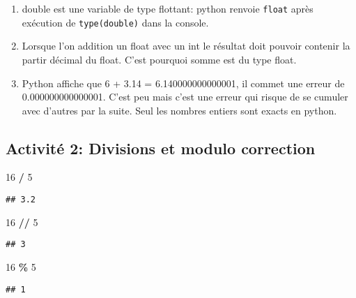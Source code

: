 \documentclass[
]{book}
\newenvironment{Shaded}{\begin{snugshade}}{\end{snugshade}}
\newcommand{\DecValTok}[1]{\textcolor[rgb]{0.00,0.00,0.81}{#1}}
\newcommand{\OperatorTok}[1]{\textcolor[rgb]{0.81,0.36,0.00}{\textbf{#1}}}
\providecommand{\tightlist}{%
  \setlength{\itemsep}{0pt}\setlength{\parskip}{0pt}}
\def\tightlist{}
\begin{document}
\begin{enumerate}
\def\labelenumi{\arabic{enumi}.}
\tightlist
\item
  double est une variable de type flottant: python renvoie \texttt{float} après exécution de \texttt{type(double)} dans la console.
\item
  Lorsque l'on addition un float avec un int le résultat doit pouvoir contenir la partir décimal du float. C'est pourquoi somme est du type float.
\item
  Python affiche que 6 + 3.14 = 6.140000000000001, il commet une erreur de 0.000000000000001. C'est peu mais c'est une erreur qui risque de se cumuler avec d'autres par la suite. Seul les nombres entiers sont exacts en python.
\end{enumerate}

\newpage

\hypertarget{activituxe9-2-divisions-et-modulo-correction}{%
\subsection{Activité 2: Divisions et modulo correction}\label{activituxe9-2-divisions-et-modulo-correction}}

\begin{Shaded}
\begin{Highlighting}[]
\DecValTok{16} \OperatorTok{/} \DecValTok{5}
\end{Highlighting}
\end{Shaded}

\begin{verbatim}
## 3.2
\end{verbatim}

\begin{Shaded}
\begin{Highlighting}[]
\DecValTok{16} \OperatorTok{//} \DecValTok{5}
\end{Highlighting}
\end{Shaded}

\begin{verbatim}
## 3
\end{verbatim}

\begin{Shaded}
\begin{Highlighting}[]
\DecValTok{16} \OperatorTok{\%} \DecValTok{5}
\end{Highlighting}
\end{Shaded}

\begin{verbatim}
## 1
\end{verbatim}
\end{document}
